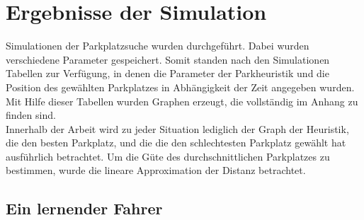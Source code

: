 \section{Ergebnisse der Simulation}

Simulationen der Parkplatzsuche wurden durchgeführt. Dabei wurden verschiedene Parameter gespeichert. Somit standen nach den Simulationen Tabellen zur Verfügung, in denen die Parameter der Parkheuristik und die Position des gewählten Parkplatzes in Abhängigkeit der Zeit angegeben wurden. \\
Mit Hilfe dieser Tabellen wurden Graphen erzeugt, die vollständig im Anhang zu finden sind.\\
Innerhalb der Arbeit wird zu jeder Situation lediglich der Graph der Heuristik, die den besten Parkplatz, und die die den schlechtesten Parkplatz gewählt hat ausführlich betrachtet. Um die Güte des durchschnittlichen Parkplatzes zu bestimmen, wurde die lineare Approximation der Distanz betrachtet. \\
\subsection{Ein lernender Fahrer}\label{sec:sim_singlemutant}
